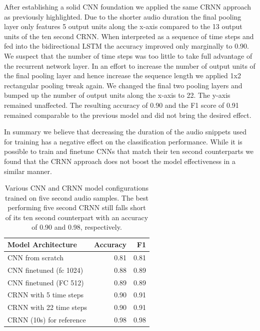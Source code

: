 After establishing a solid CNN foundation we applied the same CRNN approach as previously highlighted. Due to the shorter audio duration the final pooling layer only features 5 output units along the x-axis compared to the 13 output units of the ten second CRNN. When interpreted as a sequence of time steps and fed into the bidirectional LSTM the accuracy improved only marginally to 0.90. We suspect that the number of time steps was too little to take full advantage of the recurrent network layer.
In an effort to increase the number of output units of the final pooling layer and hence increase the sequence length we applied 1x2 rectangular pooling tweak again. We changed the final two pooling layers and bumped up the number of output units along the x-axis to 22. The y-axis remained unaffected. The resulting accuracy of 0.90 and the F1 score of 0.91 remained comparable to the previous model and did not bring the desired effect. 

In summary we believe that decreasing the duration of the audio snippets used for training has a negative effect on the classification performance. While it is possible to train and finetune CNNs that match their ten second counterparts we found that the CRNN approach does not boost the model effectiveness in a similar manner.
	
	\begin{table}[]
	\centering
	\begin{tabularx}{\textwidth}{lrr}
	\toprule
	Model Architecture		& Accuracy 		& F1 	\\ \midrule
	CNN from scratch    		& 0.81			& 0.81 	\\
	CNN finetuned (\ac{fc} 1024)	& 0.88			& 0.89 	\\
	CNN finetuned (FC 512)	& 0.89			& 0.89 	\\
	CRNN with 5 time steps	& 0.90			& 0.91 	\\
	CRNN with 22 time steps & 0.90			& 0.91 	\\ \midrule
	CRNN (10s) for reference& 0.98			& 0.98 	\\ 
 	\bottomrule
	\end{tabularx}
	\caption{Various CNN and CRNN model configurations trained on five second audio samples. The best performing five second CRNN still falls short of its ten second counterpart with an accuracy of 0.90 and 0.98, respectively.}
	\label{tab:audio_duration}
	\end{table}


